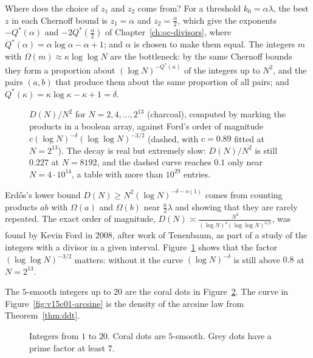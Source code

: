 Where does the choice of $z_1$ and $z_2$ come from? For a threshold $k_0=\alpha\lambda$, the best $z$ in each Chernoff bound is $z_1=\alpha$ and $z_2=\frac\alpha2$, which give the exponents $-Q^*(\alpha)$ and $-2Q^*(\frac\alpha2)$ of Chapter~\ref{ch:oc-divisors}, where $Q^*(\alpha)=\alpha\log\alpha-\alpha+1$; and $\alpha$ is chosen to make them equal. The integers $m$ with $\Omega(m)\approx\kappa\log\log N$ are the bottleneck: by the same Chernoff bounds they form a proportion about $(\log N)^{-Q^*(\kappa)}$ of the integers up to $N^2$, and the pairs $(a,b)$ that produce them about the same proportion of all pairs; and $Q^*(\kappa)=\kappa\log\kappa-\kappa+1=\delta$.

\begin{figure}[ht]
\centering{}
\caption{$D(N)/N^2$ for $N=2,4,\dots,2^{13}$ (charcoal), computed by marking the products in a boolean array, against Ford's order of magnitude $c(\log N)^{-\delta}(\log\log N)^{-3/2}$ (dashed, with $c=0.89$ fitted at $N=2^{13}$). The decay is real but extremely slow: $D(N)/N^2$ is still $0.227$ at $N=8192$, and the dashed curve reaches $0.1$ only near $N=4\cdot10^{14}$, a table with more than $10^{29}$ entries.}
\label{fig:table}
\end{figure}

\begin{remark}
Erd\H{o}s's lower bound $D(N)\ge N^2(\log N)^{-\delta-o(1)}$ comes from counting products $ab$ with $\Omega(a)$ and $\Omega(b)$ near $\frac\kappa2\lambda$ and showing that they are rarely repeated. The exact order of magnitude, $D(N)\asymp\frac{N^2}{(\log N)^\delta(\log\log N)^{3/2}}$, was found by Kevin Ford in 2008, after work of Tenenbaum, as part of a study of the integers with a divisor in a given interval. Figure~\ref{fig:table} shows that the factor $(\log\log N)^{-3/2}$ matters: without it the curve $(\log N)^{-\delta}$ is still above $0.8$ at $N=2^{13}$.
\end{remark}

The \(5\)-smooth integers up to \(20\) are the coral dots in Figure~\ref{fig:v15c01-smooth}. The curve in Figure~\ref{fig:v15c01-arcsine} is the density of the arcsine law from Theorem~\ref{thm:ddt}.

\begin{figure}[ht]
\centering
{}
\caption{Integers from \(1\) to \(20\). Coral dots are \(5\)-smooth. Grey dots have a prime factor at least \(7\).}
\label{fig:v15c01-smooth}
\end{figure}

